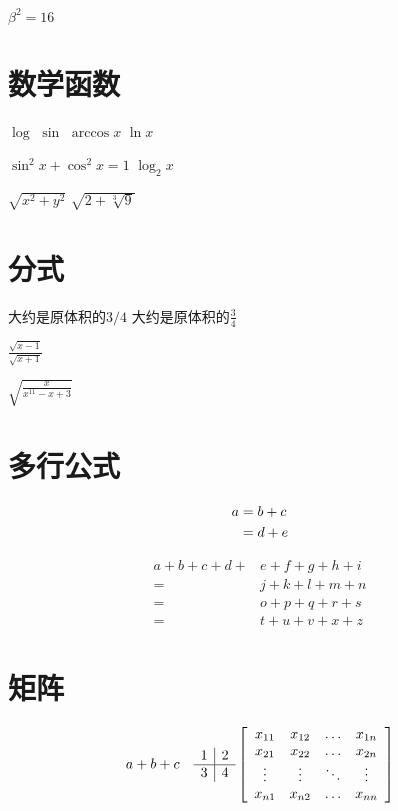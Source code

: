 \documentclass{article}
\begin{document}
    $\beta^2 = 16$

\section{数学函数}
    $\log$
    $\sin$
    $\arccos x$
    $\ln x$

    $\sin^2 x+\cos^2 x = 1$
    $\log_2 x$

    $\sqrt{x ^ 2 + y ^ 2}$
    $\sqrt{2 + \sqrt[3]{9}}$ %

\section{分式}
    大约是原体积的$3/4$
    大约是原体积的$\frac{3}{4}$

    $\frac{\sqrt{x-1}}{\sqrt{x+1}}$

    $\sqrt{\frac{x}{x^{11} - x + 3}}$



\section{多行公式}
    \begin{align} 
    a & = b + c \notag \\ 
    &=d+e 
    \end{align}
    
    \[
    \begin{aligned}  %
    a+b+c+d+& e+f+g+h+i \\
    =& j+k+l+m+n \\
    =& o+p+q+r+s \\ 
    =& t+u+v+x+z \end{aligned}
    \]

\section{矩阵}
    \[
    a + b \\ + c\quad %
    \begin{array}{l | l}
    {1} & {2} \\ 
    \hline
    {3} & {4}
    \end{array} 
    \left[\begin{array}{cccc}
    {x_{11}} & {x_{12}} & {\dots} & {x_{1 n}} \\ 
    {x_{21}} & {x_{22}} & {\dots} & {x_{2 n}} \\ 
    {\vdots} & {\vdots} & {\ddots} & {\vdots} \\ 
    {x_{n 1}} & {x_{n 2}} & {\dots} & {x_{n n}}
    \end{array}\right]
    \]
\end{document}
